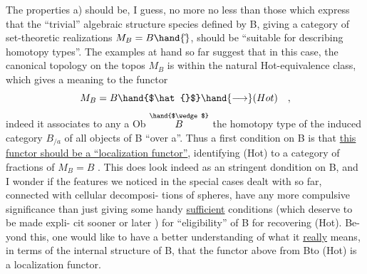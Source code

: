 The properties a) should be, I guess, no more no less than those
which express that the ``trivial'' algebraic structure species defined by
B, giving a category of set-theoretic realizations $M_B = B\hand{\hat{}}$, should be
``suitable for describing homotopy types''. The examples at hand so
far suggest that in this case, the canonical topology on the topos $M_B$
is within the natural Hot-equivalence class, which gives a meaning to
the functor
\[ M_B = B\hand{$\hat{}$} \hand{\longrightarrow} (Hot) \quad , \]
indeed it associates to any a \hand{$\in$} Ob $\overset{\hand{$\wedge$}}{B}$ the homotopy type of the induced
category $B_{/a}$ of all objects of B ``over a''. Thus a first condition on
B is that \uline{this functor should be a ``localization functor''}, identifying
(Hot) to a category of fractions of $M_B = B$\hand{$\hat{}$} . This does look indeed as
an  stringent dondition on B, and I wonder if the features we noticed in
the special cases dealt with so far, connected with cellular decomposi-%
tions of spheres, have any more compulsive significance than just
giving some handy \uline{sufficient} conditions (which deserve to be made expli-%
cit sooner or later \hand{!}) for ``eligibility'' of B for recovering (Hot). Be-%
yond this, one would  like to have a better understanding of what it
\uline{really} means, in terms of the internal structure of B, that the
functor above from B\hand{$\hat{}$}\hand{/}to (Hot) is a localization functor.
